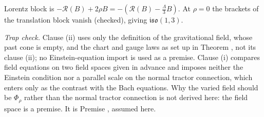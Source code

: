 Lorentz block is $-\mathcal{R}(B) + 2\rho B = -(\mathcal{R}(B) - \tfrac{\Lambda}{3}B)$. At $\rho = 0$ the brackets of the translation block vanish (checked), giving $\mathfrak{iso}(1,3)$.

\emph{Trap check.} Clause (ii) uses only the definition of the gravitational field, whose past cone is empty, and the chart and gauge laws as set up in Theorem , not its clause (ii); no Einstein-equation import is used as a premise. Clause (i) compares field equations on two field spaces given in advance and imposes neither the Einstein condition nor a parallel scale on the normal tractor connection, which enters only as the contrast with the Bach equations. Why the varied field should be $\Phi_{\rho}$ rather than the normal tractor connection is not derived here: the field space is a premise. It is Premise , assumed here.
